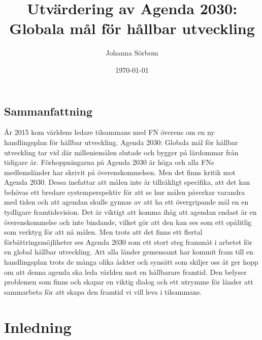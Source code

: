 \documentclass{report}
\title{Utvärdering av Agenda 2030: Globala mål för hållbar utveckling}
\date{\today}
\author{Johanna Sörbom}
\begin{document}
\maketitle

\newpage
\begin{titlepage}
\section*{Sammanfattning}
År 2015 kom världens ledare tilsammans med FN överens om en ny handlingsplan för hållbar utveckling. Agenda 2030: Globala mål för hållbar utveckling tar vid där milleniemålen slutade och bygger på lärdommar från tidigare år. Förhoppningarna på Agenda 2030 är höga och alla FNs medlemsländer har skrivit på överenskommelsen. Men det finns kritik mot Agenda 2030. Dessa inefattar att målen inte är tillräkligt specifika, att det kan behövas ett bredare systemperspektiv för att se hur målen påverkar varandra med tiden och att agendan skulle gynnas av att ha ett övergripande mål en en tydligare framtidsvision. Det är viktigt att komma ihåg att agendan endast är en överenskommelse och inte bindande, vilket gör att den kan ses som ett opålitlig som verktyg för att nå målen. Men trots att det finns ett flertal förbättringsmöjliheter ses Agenda 2030 som ett stort steg frammåt i arbetet för en global hållbar utveckling. Att alla länder gemensamt har kommit fram till en handlingsplan trots de många olika åskter och synsätt som skiljer oss åt ger hopp om att denna agenda ska leda världen mot en hållbarare framtid. Den belyser problemen som finns och skapar en viktig dialog och ett utrymme för länder att sammarbeta för att skapa den framtid vi vill leva i tilsammans. 

\newpage
\tableofcontents
\end{titlepage}
\newpage
{}
\section{Inledning}
\end{document}
